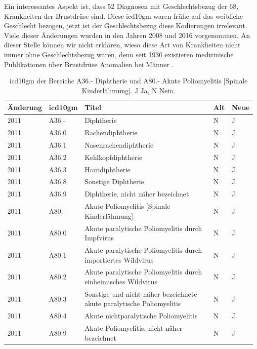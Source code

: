 Ein interessantes Aspekt ist, dass \textsf{52} Diagnosen mit Geschlechtsbezug der \textsf{68}, Krankheiten der Brustdrüse sind. Diese \ac{icd10gm} waren frühe auf das weibliche Geschlecht bezogen, jetzt ist der Geschlechtsbezug diese Kodierungen irrelevant. Viele dieser Änderungen wurden in den Jahren 2008 und 2016 vorgenommen. An dieser Stelle können wir nicht erklären, wieso diese Art von Krankheiten nicht immer ohne Geschlechtsbezug waren, denn seit 1930 existieren medizinische Publikationen über Brustdrüse Anomalien bei Männer \cite{bcm}. 

\begin{table}[ht]
	\centering
	\caption[Diphtherie und Poliomyelitis]{\ac{icd10gm} der Bereiche \textsf{A36.-} \textsf{Diphtherie} und \textsf{A80.-} \textsf{Akute Poliomyelitis [Spinale Kinderlähmung]}. \textsf{J} Ja, \textsf{N} Nein.}
	\label{tab:icdeuropa}
	\begin{tabular}{|l|l|p{8cm}|l|l|}
		\hline
		\rowcolor{lightgray} Änderung & \ac{icd10gm} & Titel & Alt & Neue \\ \hline
		2011 & A36.- & Diphtherie & N & J \\ \hline
		2011 & A36.0 & Rachendiphtherie & N & J \\ \hline
		2011 & A36.1 & Nasenrachendiphtherie & N & J \\ \hline
		2011 & A36.2 & Kehlkopfdiphtherie & N & J \\ \hline
		2011 & A36.3 & Hautdiphtherie & N & J \\ \hline
		2011 & A36.8 & Sonstige Diphtherie & N & J \\ \hline
		2011 & A36.9 & Diphtherie, nicht näher bezeichnet & N & J \\ \hline
		2011 & A80.- & Akute Poliomyelitis [Spinale Kinderlähmung] & N & J \\ \hline
		2011 & A80.0 & Akute paralytische Poliomyelitis durch Impfvirus & N & J \\ \hline
		2011 & A80.1 & Akute paralytische Poliomyelitis durch importiertes Wildvirus & N & J \\ \hline
		2011 & A80.2 & Akute paralytische Poliomyelitis durch einheimisches Wildvirus & N & J \\ \hline
		2011 & A80.3 & Sonstige und nicht näher bezeichnete akute paralytische Poliomyelitis & N & J \\ \hline
		2011 & A80.4 & Akute nichtparalytische Poliomyelitis & N & J \\ \hline
		2011 & A80.9 & Akute Poliomyelitis, nicht näher bezeichnet & N & J \\ \hline
	\end{tabular}
\end{table}


